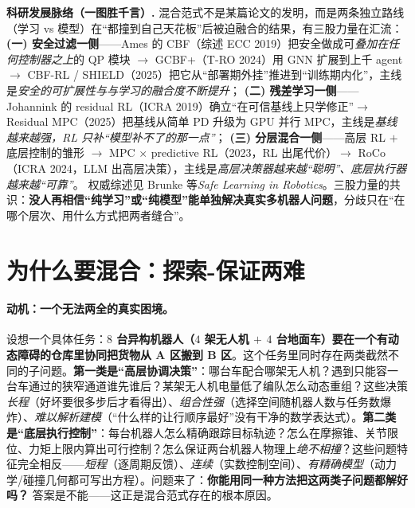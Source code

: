 \begin{note}
\textbf{科研发展脉络（一图胜千言）.}\;
混合范式不是某篇论文的发明，而是两条独立路线（学习 vs 模型）在“都撞到自己天花板”后被迫融合的结果，有三股力量在汇流：
\textbf{(一) 安全过滤一侧}——Ames 的 CBF（综述 ECC 2019\cite{ames2019cbf}）把安全做成可\emph{叠加在任何控制器之上}的 QP 模块 $\to$ GCBF+（T-RO 2024\cite{zhang2025gcbfplus}）用 GNN 扩展到上千 agent $\to$ CBF-RL / SHIELD（2025\cite{gandhi2023shield,yin2023shield}）把它从“部署期外挂”推进到“训练期内化”，主线是\emph{安全的可扩展性与与学习的融合度不断提升}；
\textbf{(二) 残差学习一侧}——Johannink 的 residual RL（ICRA 2019\cite{johannink2019residual}）确立“在可信基线上只学修正”$\to$ Residual MPC（2025\cite{residualmpc2025}）把基线从简单 PD 升级为 GPU 并行 MPC，主线是\emph{基线越来越强，RL 只补“模型补不了的那一点”}；
\textbf{(三) 分层混合一侧}——高层 RL $+$ 底层控制的雏形 %
$\to$ MPC $\times$ predictive RL（2023\cite{bjelonic2023mpcrl}，RL 出尾代价）$\to$ RoCo（ICRA 2024\cite{mandi2024roco}，LLM 出高层决策），主线是\emph{高层决策器越来越“聪明”、底层执行器越来越“可靠”}。
权威综述见 Brunke 等\emph{Safe Learning in Robotics}\cite{brunke2022safe}。三股力量的共识：\textbf{没人再相信“纯学习”或“纯模型”能单独解决真实多机器人问题}，分歧只在“在哪个层次、用什么方式把两者缝合”。
\end{note}

\section{为什么要混合：探索-保证两难}
\label{sec:mh-why}

\paragraph{动机：一个无法两全的真实困境。}
设想一个具体任务：\textbf{$8$ 台异构机器人（$4$ 架无人机 $+$ $4$ 台地面车）要在一个有动态障碍的仓库里协同把货物从 A 区搬到 B 区}。这个任务里同时存在两类截然不同的子问题。\textbf{第一类是“高层协调决策”}：哪台车配合哪架无人机？遇到只能容一台车通过的狭窄通道谁先谁后？某架无人机电量低了编队怎么动态重组？这些决策\emph{长程}（好坏要很多步后才看得出）、\emph{组合性强}（选择空间随机器人数与任务数爆炸）、\emph{难以解析建模}（“什么样的让行顺序最好”没有干净的数学表达式）。\textbf{第二类是“底层执行控制”}：每台机器人怎么精确跟踪目标轨迹？怎么在摩擦锥、关节限位、力矩上限内算出可行控制？怎么保证两台机器人物理上\emph{绝不相撞}？这些问题特征完全相反——\emph{短程}（逐周期反馈）、\emph{连续}（实数控制空间）、\emph{有精确模型}（动力学/碰撞几何都可写出方程）。问题来了：\textbf{你能用同一种方法把这两类子问题都解好吗？} 答案是不能——这正是混合范式存在的根本原因。

